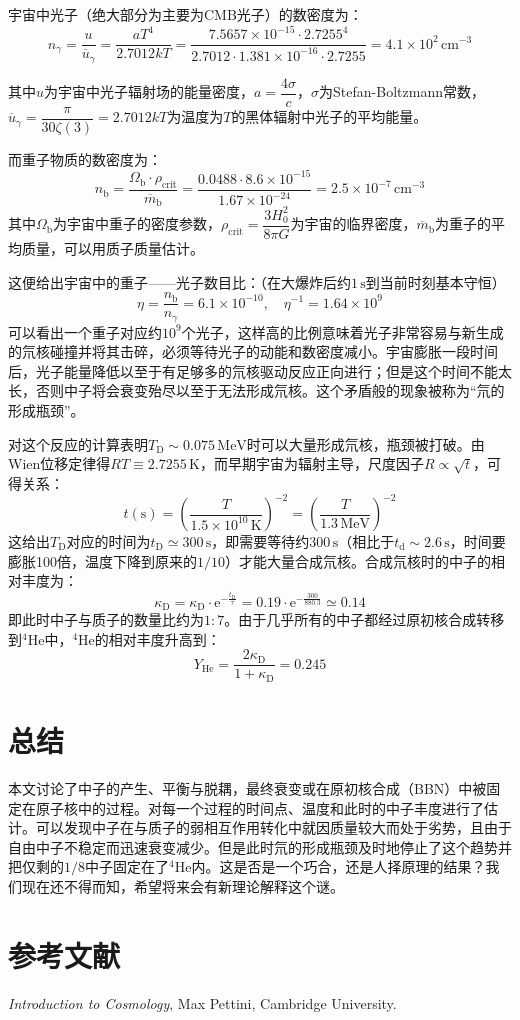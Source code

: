 \documentclass[a4paper,fontset=none]{ctexart}
\begin{document}
宇宙中光子（绝大部分为主要为CMB光子）的数密度为：
\[
n_\gamma
= \frac{u}{\overline{u}_\gamma}
= \frac{aT^4}{2.7012kT}
= \frac{7.5657\times10^{-15}\cdot2.7255^4}{2.7012\cdot1.381\times10^{-16}\cdot2.7255}
= 4.1\times10^2\,\mathrm{cm}^{-3}
\]

其中$u$为宇宙中光子辐射场的能量密度，$a=\dfrac{4\sigma}{c}$，$\sigma$为Stefan-Boltzmann常数，$\overline{u}_\gamma=\dfrac{\pi}{30\zeta(3)}=2.7012kT$为温度为$T$的黑体辐射中光子的平均能量。

而重子物质的数密度为：
\[
n_\mathrm{b}
= \frac{\Omega_\mathrm{b}\cdot\rho_\mathrm{crit}}{\overline{m}_\mathrm{b}}
= \frac{0.0488\cdot8.6\times10^{-15}}{1.67\times10^{-24}}
= 2.5\times10^{-7}\,\mathrm{cm}^{-3}
\]
其中$\Omega_\mathrm{b}$为宇宙中重子的密度参数，$\rho_\mathrm{crit}=\dfrac{3H_0^2}{8\pi G}$为宇宙的临界密度，$\overline{m}_\mathrm{b}$为重子的平均质量，可以用质子质量估计。

这便给出宇宙中的重子——光子数目比：（在大爆炸后约$1\,\mathrm{s}$到当前时刻基本守恒）
\[
\eta = \frac{n_\mathrm{b}}{n_\gamma} = 6.1\times10^{-10},\quad
\eta^{-1} = 1.64\times10^9
\]
可以看出一个重子对应约$10^9$个光子，这样高的比例意味着光子非常容易与新生成的氘核碰撞并将其击碎，必须等待光子的动能和数密度减小。宇宙膨胀一段时间后，光子能量降低以至于有足够多的氘核驱动反应正向进行；但是这个时间不能太长，否则中子将会衰变殆尽以至于无法形成氘核。这个矛盾般的现象被称为“氘的形成瓶颈”。

对这个反应的计算表明$T_\mathrm{D}\sim0.075\,\mathrm{MeV}$时可以大量形成氘核，瓶颈被打破。由Wien位移定律得$RT\equiv2.7255\,\mathrm{K}$，而早期宇宙为辐射主导，尺度因子$R\propto\sqrt{t}$，可得关系：
\[
t(\mathrm{s}) = \left(\frac{T}{1.5\times10^{10}\,\mathrm{K}}\right)^{-2} = \left(\frac{T}{1.3\,\mathrm{MeV}}\right)^{-2}
\]
这给出$T_\mathrm{D}$对应的时间为$t_\mathrm{D}\simeq300\,\mathrm{s}$，即需要等待约$300\,\mathrm{s}$（相比于$t_\mathrm{d}\sim2.6\,\mathrm{s}$，时间要膨胀100倍，温度下降到原来的$1/10$）才能大量合成氘核。合成氘核时的中子的相对丰度为：
\[
\kappa_\mathrm{D} = \kappa_\mathrm{D}\cdot\mathrm{e}^{-\tfrac{t_\mathrm{D}}{\tau}} = 0.19\cdot\mathrm{e}^{-\tfrac{300}{880.3}} \simeq 0.14
\]
即此时中子与质子的数量比约为$1:7$。由于几乎所有的中子都经过原初核合成转移到$^{4}\mathrm{He}$中，$^{4}\mathrm{He}$的相对丰度升高到：
\[
Y_\mathrm{He} = \frac{2\kappa_\mathrm{D}}{1+\kappa_\mathrm{D}} = 0.245
\]

\section*{总结}

本文讨论了中子的产生、平衡与脱耦，最终衰变或在原初核合成（BBN）中被固定在原子核中的过程。对每一个过程的时间点、温度和此时的中子丰度进行了估计。可以发现中子在与质子的弱相互作用转化中就因质量较大而处于劣势，且由于自由中子不稳定而迅速衰变减少。但是此时氘的形成瓶颈及时地停止了这个趋势并把仅剩的$1/8$中子固定在了$^{4}\mathrm{He}$内。这是否是一个巧合，还是人择原理的结果？我们现在还不得而知，希望将来会有新理论解释这个谜。

\section*{参考文献}

\textit{Introduction to Cosmology}, Max Pettini, Cambridge University.
\end{document}
